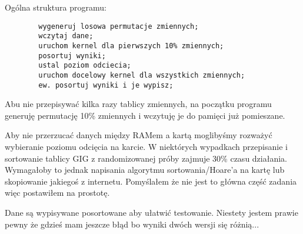 \documentclass[a4paper]{article}
\begin{document}
    Ogólna struktura programu:
    \begin{lstlisting}
        wygeneruj losowa permutacje zmiennych;
        wczytaj dane;
        uruchom kernel dla pierwszych 10% zmiennych;
        posortuj wyniki;
        ustal poziom odciecia;
        uruchom docelowy kernel dla wszystkich zmiennych;
        ew. posortuj wyniki i je wypisz;
    \end{lstlisting} 
    Abu nie przepisywać kilka razy tablicy zmiennych, na początku programu generuję permutację 10\% zmiennych i wczytuję je do pamięci już pomieszane.

    Aby nie przerzucać danych między RAMem a kartą moglibyśmy rozważyć wybieranie poziomu odcięcia na karcie. W niektórych wypadkach przepisanie i sortowanie tablicy GIG z randomizowanej próby zajmuje 30\% czasu działania. Wymagałoby to jednak napisania algorytmu sortowania/Hoare'a na kartę lub skopiowanie jakiegoś z internetu. Pomyślałem że nie jest to główna część zadania więc postawiłem na prostotę.

    Dane są wypisywane posortowane aby ułatwić testowanie. Niestety jestem prawie pewny że gdzieś mam jeszcze błąd bo wyniki dwóch wersji się różnią...
\end{document}
